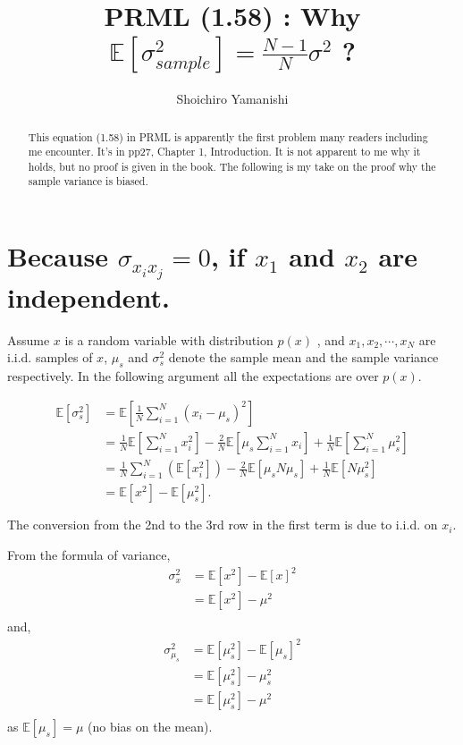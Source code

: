 \documentclass[a4]{article}
\title{PRML (1.58) : Why $\mathbb{E}[\sigma_{sample}^2] = \frac{N-1}{N}\sigma^2$ ?}
\author{Shoichiro Yamanishi}
\begin{document}
\maketitle

\begin{abstract}
This equation (1.58) in PRML\cite{bishop2007}
 is apparently the first problem many readers including me encounter.
It's in pp27, Chapter 1, Introduction.
It is not apparent to me why it holds, but no proof is given in the book.
The following is my take on the proof why the sample variance is biased.
\end{abstract}

\section{ Because $\sigma_{{x_i}{x_j}} = 0$, if $x_1$ and $x_2$ are independent.}

Assume $x$ is a random variable with distribution $p(x)$ , and $x_1, x_2, \cdots, x_N$ are i.i.d. samples of $x$,
$\mu_s$ and $\sigma^2_s$ denote the sample mean and the sample variance respectively.
In the following argument all the expectations are over $p(x)$.

\begin{equation}
\begin{aligned}
\mathbb{E}[\sigma_s^2] &= \mathbb{E}[\frac{1}{N}\sum_{i=1}^N(x_i - \mu_s)^2]\\
&= \frac{1}{N}\mathbb{E}[\sum_{i=1}^Nx_i^2] - \frac{2}{N}\mathbb{E}[\mu_{s}\sum_{i=1}^{N}x_i] + \frac{1}{N}\mathbb{E}[\sum_{i=1}^{N}\mu_{s}^2]\\
&= \frac{1}{N}\sum_{i=1}^N(\mathbb{E}[x_i^2]) - \frac{2}{N}\mathbb{E}[\mu_{s}N\mu_{s}] + \frac{1}{N}\mathbb{E}[N\mu_{s}^2]\\
&= \mathbb{E}[x^2] - \mathbb{E}[\mu_{s}^2].\label{eq2}\\
\\
\end{aligned}
\end{equation}
The conversion from the 2nd to the 3rd row in the first term is due to i.i.d. on $x_i$.

From the formula of variance,
\begin{equation}
\begin{aligned}
\sigma_x^2 &= \mathbb{E}[x^2] - \mathbb{E}[x]^2\\
           &= \mathbb{E}[x^2] - \mu^2\label{eq3}\\
\end{aligned}
\end{equation}
and,
\begin{equation}
\begin{aligned}
\sigma_{\mu_s}^2 &= \mathbb{E}[\mu_s^2] - \mathbb{E}[\mu_s]^2\\
           &= \mathbb{E}[\mu_s^2] - \mu_s^2\\
           &= \mathbb{E}[\mu_s^2] - \mu^2\label{eq4}\\
\end{aligned}
\end{equation}
as $\mathbb{E}[\mu_s] = \mu$ (no bias on the mean).
\end{document}
